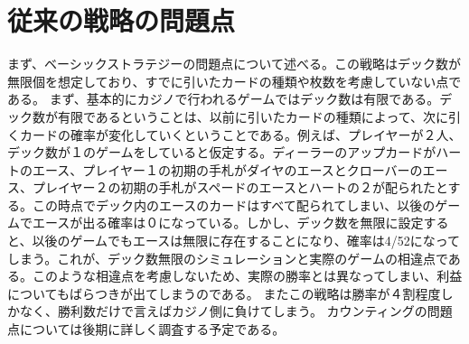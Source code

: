 \section{従来の戦略の問題点}
まず、ベーシックストラテジーの問題点について述べる。この戦略はデック数が無限個を想定しており、すでに引いたカードの種類や枚数を考慮していない点である。
まず、基本的にカジノで行われるゲームではデック数は有限である。デック数が有限であるということは、以前に引いたカードの種類によって、次に引くカードの確率が変化していくということである。例えば、プレイヤーが２人、デック数が１のゲームをしていると仮定する。ディーラーのアップカードがハートのエース、プレイヤー１の初期の手札がダイヤのエースとクローバーのエース、プレイヤー２の初期の手札がスペードのエースとハートの２が配られたとする。この時点でデック内のエースのカードはすべて配られてしまい、以後のゲームでエースが出る確率は０になっている。しかし、デック数を無限に設定すると、以後のゲームでもエースは無限に存在することになり、確率は4/52になってしまう。これが、デック数無限のシミュレーションと実際のゲームの相違点である。このような相違点を考慮しないため、実際の勝率とは異なってしまい、利益についてもばらつきが出てしまうのである。
またこの戦略は勝率が４割程度しかなく、勝利数だけで言えばカジノ側に負けてしまう。
カウンティングの問題点については後期に詳しく調査する予定である。

